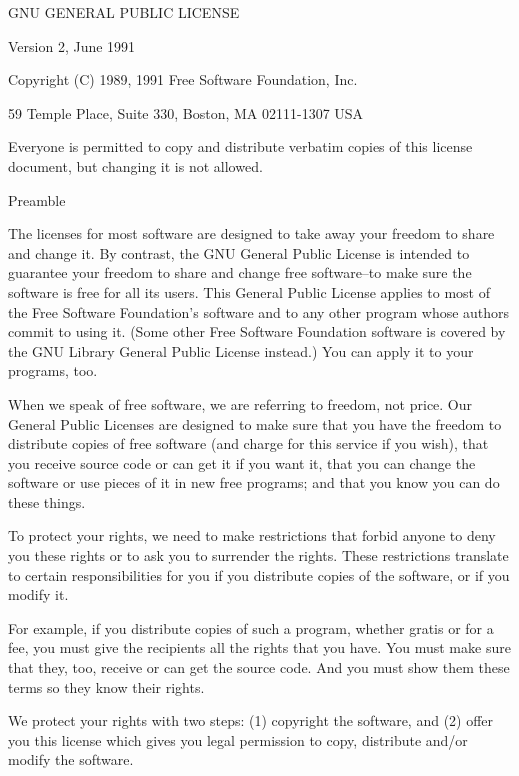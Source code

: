 {	\begin{center}
		GNU GENERAL PUBLIC LICENSE
		
		Version 2, June 1991
		
		
	\end{center}
	
	Copyright (C) 1989, 1991 Free Software Foundation, Inc.
	
	59 Temple Place, Suite 330, Boston, MA  02111-1307  USA
	
	Everyone is permitted to copy and distribute verbatim copies
	of this license document, but changing it is not allowed.
	
	\begin{center}
		Preamble
	\end{center}
	
	The licenses for most software are designed to take away your
	freedom to share and change it.  By contrast, the GNU General Public
	License is intended to guarantee your freedom to share and change free
	software--to make sure the software is free for all its users.  This
	General Public License applies to most of the Free Software
	Foundation's software and to any other program whose authors commit to
	using it.  (Some other Free Software Foundation software is covered by
	the GNU Library General Public License instead.)  You can apply it to
	your programs, too.
	
	When we speak of free software, we are referring to freedom, not
	price.  Our General Public Licenses are designed to make sure that you
	have the freedom to distribute copies of free software (and charge for
	this service if you wish), that you receive source code or can get it
	if you want it, that you can change the software or use pieces of it
	in new free programs; and that you know you can do these things.
	
	To protect your rights, we need to make restrictions that forbid
	anyone to deny you these rights or to ask you to surrender the rights.
	These restrictions translate to certain responsibilities for you if you
	distribute copies of the software, or if you modify it.
	
	For example, if you distribute copies of such a program, whether
	gratis or for a fee, you must give the recipients all the rights that
	you have.  You must make sure that they, too, receive or can get the
	source code.  And you must show them these terms so they know their
	rights.
	
	We protect your rights with two steps: (1) copyright the software, and
	(2) offer you this license which gives you legal permission to copy,
	distribute and/or modify the software.
	
}
